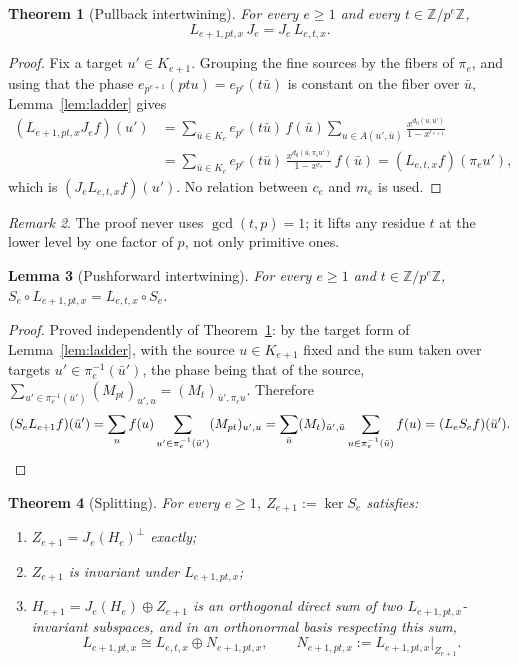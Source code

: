 \documentclass[11pt]{article}
\newtheorem{theorem}{Theorem}
\newtheorem{lemma}[theorem]{Lemma}
\theoremstyle{definition}
\theoremstyle{remark}
\newtheorem{remark}[theorem]{Remark}
\newcommand{\Z}{\mathbb{Z}}
\begin{document}
\begin{theorem}[Pullback intertwining]\label{thm:intertwine}
For every $e\ge1$ and every $t\in\Z/p^e\Z$,
\[
L_{e+1,pt,x}\,J_e=J_e\,L_{e,t,x}.
\]
\end{theorem}

\begin{proof}
Fix a target $u'\in K_{e+1}$. Grouping the fine sources by the fibers of $\pi_e$, and using that the phase $e_{p^{e+1}}(ptu)=e_{p^e}(t\bar u)$ is constant on the fiber over $\bar u$, Lemma~\ref{lem:ladder} gives
\begin{align*}
(L_{e+1,pt,x}J_ef)(u')&=\sum_{\bar u\in K_e}e_{p^e}(t\bar u)\,f(\bar u)\!\!\sum_{u\in A(u',\bar u)}\!\!\frac{x^{d_0(u,u')}}{1-x^{r_{e+1}}}\\
&=\sum_{\bar u\in K_e}e_{p^e}(t\bar u)\,\frac{x^{d_0(\bar u,\pi_eu')}}{1-x^{r_e}}\,f(\bar u)
=(L_{e,t,x}f)(\pi_eu'),
\end{align*}
which is $(J_eL_{e,t,x}f)(u')$. No relation between $c_e$ and $m_e$ is used.
\end{proof}

\begin{remark}
The proof never uses $\gcd(t,p)=1$; it lifts any residue $t$ at the lower level by one factor of $p$, not only primitive ones.
\end{remark}

\begin{lemma}[Pushforward intertwining]\label{lem:push}
For every $e\ge1$ and $t\in\Z/p^e\Z$, $S_e\circ L_{e+1,pt,x}=L_{e,t,x}\circ S_e$.
\end{lemma}

\begin{proof}
Proved independently of Theorem~\ref{thm:intertwine}: by the target form of Lemma~\ref{lem:ladder}, with the source $u\in K_{e+1}$ fixed and the sum taken over targets $u'\in\pi_e^{-1}(\bar u')$, the phase being that of the source, $\sum_{u'\in\pi_e^{-1}(\bar u')}(M_{pt})_{u',u}=(M_t)_{\bar u',\pi_e u}$. Therefore
\[
(S_eL_{e+1}f)(\bar u')=\sum_{u}f(u)\sum_{u'\in\pi_e^{-1}(\bar u')}(M_{pt})_{u',u}
=\sum_{\bar u}(M_t)_{\bar u',\bar u}\sum_{u\in\pi_e^{-1}(\bar u)}f(u)=(L_eS_ef)(\bar u').\qedhere
\]
\end{proof}

\begin{theorem}[Splitting]\label{thm:split}
For every $e\ge1$, $Z_{e+1}:=\ker S_e$ satisfies:
\begin{enumerate}
\item $Z_{e+1}=J_e(H_e)^\perp$ exactly;
\item $Z_{e+1}$ is invariant under $L_{e+1,pt,x}$;
\item $H_{e+1}=J_e(H_e)\oplus Z_{e+1}$ is an orthogonal direct sum of two $L_{e+1,pt,x}$-invariant subspaces, and in an orthonormal basis respecting this sum,
\[
L_{e+1,pt,x}\cong L_{e,t,x}\oplus N_{e+1,pt,x},\qquad N_{e+1,pt,x}:=L_{e+1,pt,x}\big|_{Z_{e+1}}.
\]
\end{enumerate}
\end{theorem}
\end{document}

